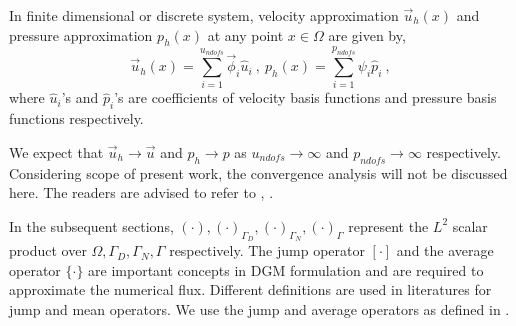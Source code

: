 \documentclass[graybox]{svmult}
\begin{document}
In finite dimensional or discrete system, velocity approximation $\overrightarrow{u}_h(x)$ and pressure approximation $p_h(x)$ at any point $x \in \Omega$ are given by,
\begin{equation}\label{velocity_pressure_coefficients}
\overrightarrow{u}_h(x) = \sum\limits_{i=1}^{u_{ndofs}} \overrightarrow{\phi}_i \hat{u}_i \ , \
p_h(x) = \sum\limits_{i=1}^{p_{ndofs}} \psi_i \hat{p}_i \ ,
\end{equation}
where $\hat{u}_i$'s and $\hat{p}_i$'s are coefficients of velocity basis functions and pressure basis functions respectively. 

We expect that $\overrightarrow{u}_h \rightarrow \overrightarrow{u}$ and $p_h \rightarrow p$ as $u_{ndofs} \rightarrow \infty$ and $p_{ndofs} \rightarrow \infty$ respectively. Considering scope of present work, the convergence analysis will not be discussed here. The readers are advised to refer to \cite{pacciarini}, \cite{riviere}. 


In the subsequent sections, $\left( \cdot \right),\left( \cdot \right)_{\Gamma_D},\left( \cdot \right)_{\Gamma_N},\left( \cdot \right)_{\Gamma}$ represent the $L^2$ scalar product over $\Omega,\Gamma_D,\Gamma_N,\Gamma$ respectively. The jump operator $\left[ \cdot \right]$ and the average operator $\lbrace \cdot \rbrace$ are important concepts in DGM formulation and are required to approximate the numerical flux. Different definitions are used in literatures for jump and mean operators. We use the jump and average operators as defined in \cite{jump_mean_operator}.
\end{document}
